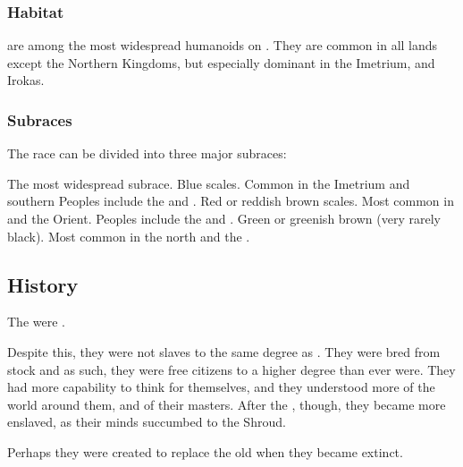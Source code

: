 \subsubsection{Habitat}
\Scathae{} are among the most widespread humanoids on \Miith{}. 
They are common in all lands except the Northern Kingdoms, but especially dominant in the Imetrium, \Durcac and Irokas. 





\subsubsection{Subraces}
The \scathaese{} race can be divided into three major subraces: 

\begin{gloss}
  \gitem[\Tassians]{\Tassian}
    The most widespread subrace. 
    Blue scales. 
    Common in the Imetrium and southern \Velcad{}
    Peoples include the  and . 
  \gitem[\Mekriis]{\Mekrii}
    Red or reddish brown scales.
    Most common in \Durcac and the Orient. 
    Peoples include the  and . 
  \gitem[\Lois]{\Loi}
    Green or greenish brown (very rarely black).
    Most common in the north and the \Serplands. 
\end{gloss}










\subsection{History}
The \scathae{} were . 

Despite this, they were not slaves to the same degree as \humans. 
They were bred from \naga{} stock and as such, they were free citizens to a higher degree than \humans{} ever were. 
They had more capability to think for themselves, and they understood more of the world around them, and of their masters. 
After the , though, they became more enslaved, as their minds succumbed to the Shroud.

Perhaps they were created to replace the old  when they became extinct. 





